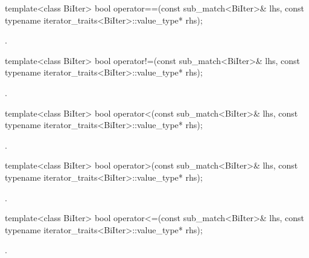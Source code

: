 %
\begin{itemdecl}
template<class BiIter>
  bool operator==(const sub_match<BiIter>& lhs,
                  const typename iterator_traits<BiIter>::value_type* rhs);
\end{itemdecl}

\begin{itemdescr}
\pnum\returns {}.
\end{itemdescr}

%
\begin{itemdecl}
template<class BiIter>
  bool operator!=(const sub_match<BiIter>& lhs,
                  const typename iterator_traits<BiIter>::value_type* rhs);
\end{itemdecl}

\begin{itemdescr}
\pnum\returns {}.
\end{itemdescr}

%
\begin{itemdecl}
template<class BiIter>
  bool operator<(const sub_match<BiIter>& lhs,
                 const typename iterator_traits<BiIter>::value_type* rhs);
\end{itemdecl}

\begin{itemdescr}
\pnum\returns {}.
\end{itemdescr}

%
\begin{itemdecl}
template<class BiIter>
  bool operator>(const sub_match<BiIter>& lhs,
                 const typename iterator_traits<BiIter>::value_type* rhs);
\end{itemdecl}

\begin{itemdescr}
\pnum\returns {}.
\end{itemdescr}

%
\begin{itemdecl}
template<class BiIter>
  bool operator<=(const sub_match<BiIter>& lhs,
                  const typename iterator_traits<BiIter>::value_type* rhs);
\end{itemdecl}

\begin{itemdescr}
\pnum
\returns {}.
\end{itemdescr}

